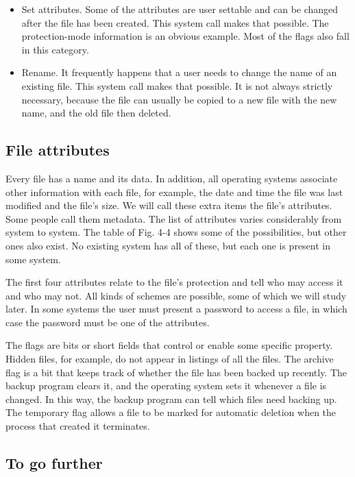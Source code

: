 \begin{itemize}
    \item Set attributes. Some of the attributes are user settable and can be changed after the file has been created. This system call makes that possible. The protection-mode information is an obvious example. Most of the flags also fall in this category.
    \item Rename. It frequently happens that a user needs to change the name of an existing file. This system call makes that possible. It is not always strictly necessary, because the file can usually be copied to a new file with the new name, and the old file then deleted.
\end{itemize}


\subsection{File attributes}

Every file has a name and its data. In addition, all operating systems associate
other information with each file, for example, the date and time the file was last
modified and the file’s size. We will call these extra items the file’s attributes.
Some people call them metadata. The list of attributes varies considerably from
system to system. The table of Fig. 4-4 shows some of the possibilities, but other
ones also exist. No existing system has all of these, but each one is present in
some system.

The first four attributes relate to the file’s protection and tell who may access it
and who may not. All kinds of schemes are possible, some of which we will study
later. In some systems the user must present a password to access a file, in which
case the password must be one of the attributes.

The flags are bits or short fields that control or enable some specific property.
Hidden files, for example, do not appear in listings of all the files. The archive flag
is a bit that keeps track of whether the file has been backed up recently. The backup
program clears it, and the operating system sets it whenever a file is changed.
In this way, the backup program can tell which files need backing up. The temporary
flag allows a file to be marked for automatic deletion when the process that
created it terminates.

\subsection{To go further}

